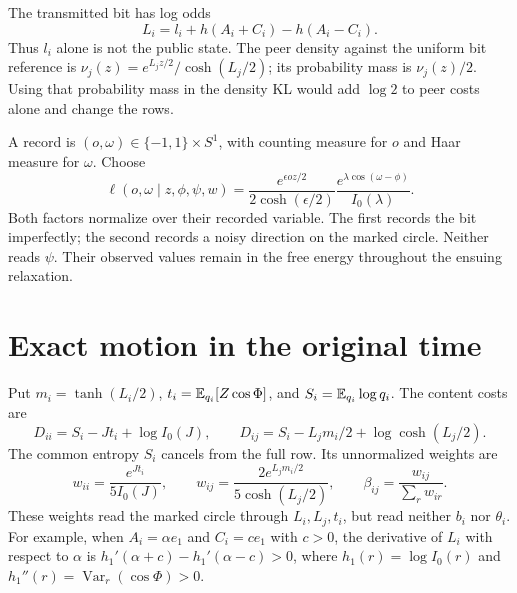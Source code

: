 The transmitted bit has log odds
\begin{equation}
 L_i=l_i+h(A_i+C_i)-h(A_i-C_i).
 \label{cp:public-odds}
\end{equation}
Thus $l_i$ alone is not the public state. The peer density against the uniform bit reference is $\nu_j(z)=e^{L_jz/2}/\cosh(L_j/2)$; its probability mass is $\nu_j(z)/2$. Using that probability mass in the density KL would add $\log2$ to peer costs alone and change the rows.

A record is $(o,\omega)\in\{-1,1\}\times S^1$, with counting measure for $o$ and Haar measure for $\omega$. Choose
\begin{equation}
 \ell(o,\omega\mid z,\phi,\psi,w)
 =\frac{e^{\epsilon oz/2}}{2\cosh(\epsilon/2)}
  \frac{e^{\lambda\cos(\omega-\phi)}}{I_0(\lambda)}.
 \label{cp:likelihood}
\end{equation}
Both factors normalize over their recorded variable. The first records the bit imperfectly; the second records a noisy direction on the marked circle. Neither reads $\psi$. Their observed values remain in the free energy throughout the ensuing relaxation.

\section{Exact motion in the original time}

Put $m_i=\tanh(L_i/2)$, $t_i=\mathbb E_{q_i}[Z\cos\Phi]$, and $S_i=\mathbb E_{q_i}\log q_i$. The content costs are
\begin{equation}
 D_{ii}=S_i-Jt_i+\log I_0(J),\qquad
 D_{ij}=S_i-L_jm_i/2+\log\cosh(L_j/2).
 \label{cp:costs}
\end{equation}
The common entropy $S_i$ cancels from the full row. Its unnormalized weights are
\begin{equation}
 w_{ii}=\frac{e^{Jt_i}}{5I_0(J)},\qquad
 w_{ij}=\frac{2e^{L_jm_i/2}}{5\cosh(L_j/2)},\qquad
 \beta_{ij}=\frac{w_{ij}}{\sum_rw_{ir}}.
 \label{cp:weights}
\end{equation}
These weights read the marked circle through $L_i,L_j,t_i$, but read neither $b_i$ nor $\theta_i$. For example, when $A_i=\alpha e_1$ and $C_i=ce_1$ with $c>0$, the derivative of $L_i$ with respect to $\alpha$ is $h_1'(\alpha+c)-h_1'(\alpha-c)>0$, where $h_1(r)=\log I_0(r)$ and $h_1''(r)=\operatorname{Var}_r(\cos\Phi)>0$.


